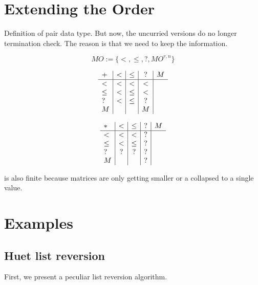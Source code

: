 \section{Extending the Order}
Definition of pair data type.
But now, the uncurried versions do no longer termination check.
The reason is that we need to keep the information.
\begin{definition}[MOrder]
\[ MO := \{ < , \leq , ? , MO^{r,n}\} \]
\end{definition}

\begin{definition}
\[
\begin{array}{l | c |c | c | c}

 +    &  <   &  \leq   &  ? & M \\
 \hline 
 <    &  <   & <       &  < &  \\
 \leq &  <   & \leq    &  < &  \\
 ?    &  <   & \leq    &  ? &  \\
 M    &      &         &  M &  
\end{array}
\]

\end{definition}


\begin{definition}
\[
\begin{array}{l | c |c | c| c }
 *    &  <  &  \leq &   ? & M \\
\hline
  <   & <    & <    &   ? &   \\
 \leq & <    & \leq &   ? &   \\
 ?    & ?    & ?    &   ? &   \\
 M    &      &      &   ? &
\end{array}
\]
\end{definition}

\begin{definition}
is also finite because matrices are only getting smaller or a collapsed to a single value.
\end{definition}

\section{Examples}


\subsection{Huet list reversion}
First, we present a peculiar list reversion algorithm.

